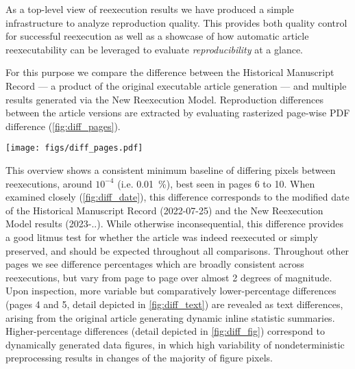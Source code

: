 As a top-level view of reexecution results we have produced a simple infrastructure to analyze reproduction quality.
This provides both quality control for successful reexecution as well as a showcase of how automatic article reexecutability can be leveraged to evaluate \textit{reproducibility} at a glance.

For this purpose we compare the difference between the Historical Manuscript Record — a product of the original executable article generation — and multiple results generated via the New Reexecution Model.
Reproduction differences between the article versions are extracted by evaluating rasterized page-wise PDF difference (\ref{fig:diff_pages}).

\begin{figure*}
	\centering
	\texttt{[image: figs/diff\_pages.pdf]}
	\caption{
		\textbf{Page-wise visual differences between the Historical Manuscript Record and New Reexecution Model results help identify overall reproduction fidelity, and identify pages with noteworthy differences.}
		Depicted are rasterized document differences, weighted 1 for changes in any pixel color channel, and rounded to four decimal points.
		Error bars represent the  percentile confidence interval.
	}
	\label{fig:diff_pages}
\end{figure*}

This overview shows a consistent minimum baseline of differing pixels between reexecutions, around $10^{-4}$ (i.e. \SI{0.01}{\percent}), best seen in pages 6 to 10.
When examined closely (\ref{fig:diff_date}), this difference corresponds to the modified date of the Historical Manuscript Record (2022-07-25) and the New Reexecution Model results (2023-..).
While otherwise inconsequential, this difference provides a good litmus test for whether the article was indeed reexecuted or simply preserved, and should be expected throughout all comparisons.
Throughout other pages we see difference percentages which are broadly consistent across reexecutions, but vary from page to page over almost 2 degrees of magnitude.
Upon inspection, more variable but comparatively lower-percentage differences (pages 4 and 5, detail depicted in \cref{fig:diff_text}) are revealed as text differences, arising from the original article generating dynamic inline statistic summaries.
Higher-percentage differences (detail depicted in \cref{fig:diff_fig}) correspond to dynamically generated data figures, in which high variability of nondeterministic preprocessing results in changes of the majority of figure pixels.

